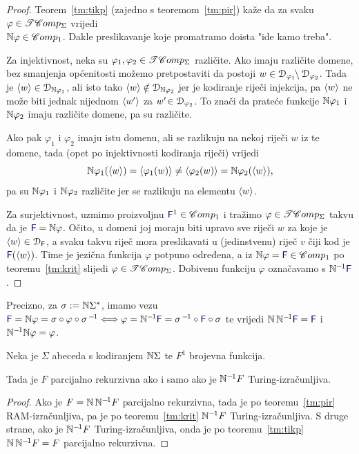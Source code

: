 \begin{proof}
Teorem~\ref{tm:tikp} (zajedno s teoremom~\ref{tm:pir}) kaže da za svaku $\varphi\in\mathscr{TC}omp_\Sigma$ vrijedi\\ ${\mathbb N}\varphi\in\mathscr Comp_1$. Dakle preslikavanje koje promatramo doista "ide kamo treba".

Za injektivnost, neka su $\varphi_1,\varphi_2\in\mathscr{TC}omp_\Sigma$ različite. Ako imaju različite domene, bez smanjenja općenitosti možemo pretpostaviti da postoji $w\in\mathcal D_{\varphi_1}\!\!\setminus\mathcal D_{\varphi_2}$. Tada je $\langle w\rangle\in\mathcal D_{{\mathbb N}\varphi_1}$, ali isto tako $\langle w\rangle\notin\mathcal D_{{\mathbb N}\varphi_2}$ jer je kodiranje riječi injekcija, pa $\langle w\rangle$ ne može biti jednak nijednom $\langle w'\rangle$ za $w'\!\in\mathcal D_{\varphi_2}$. To znači da prateće funkcije ${\mathbb N}\varphi_1$ i ${\mathbb N}\varphi_2$ imaju različite domene, pa su različite.

Ako pak $\varphi_1$ i $\varphi_2$ imaju istu domenu, ali se razlikuju na nekoj riječi $w$ iz te domene, tada (opet po injektivnosti kodiranja riječi) vrijedi
\begin{equation}
    {\mathbb N}\varphi_1(\langle w\rangle)=\langle\varphi_1(w)\rangle\ne\langle\varphi_2(w)\rangle={\mathbb N}\varphi_2(\langle w\rangle)\text,
\end{equation}
pa su ${\mathbb N}\varphi_1$ i ${\mathbb N}\varphi_2$ različite jer se razlikuju na elementu $\langle w\rangle$.

	Za surjektivnost, uzmimo proizvoljnu $\f F^1\in\mathscr Comp_1$ i tražimo $\varphi\in\mathscr{TC}omp_\Sigma$ takvu da je $\f F=\N\varphi$. Očito, u domeni joj moraju biti upravo sve riječi $w$ za koje je $\kr w\in\dom{\f F}$, a svaku takvu riječ mora preslikavati u (jedinstvenu) riječ $v$ čiji kod je $\f F(\kr w)$. Time je jezična funkcija $\varphi$ potpuno određena, a iz $\N\varphi=\f F\in\mathscr Comp_1$ po teoremu~\ref{tm:krit} slijedi $\varphi\in\mathscr{TC}omp_\Sigma$. Dobivenu funkciju $\varphi$ označavamo s $\N^{-\mspace{-2mu}1}\f F$.
\end{proof}
Precizno, za $\sigma:={\mathbb N}\Sigma^*$, imamo vezu
	$\f F=\N\varphi=\sigma\circ\varphi\circ\sigma^{\,-\mspace{-2mu}1}\Longleftrightarrow
	\varphi=\N^{-\mspace{-2mu}1}\f F=\sigma^{\,-\mspace{-2mu}1}\circ\f F\circ\sigma$
te vrijedi $\N\,\N^{-\mspace{-2mu}1}\f F=\f F$ i ${\mathbb N}^{-\mspace{-2mu}1}{\mathbb N}\varphi=\varphi$.

\begin{korolar}[{name=[jednomjesne brojevne funkcije u različitim modelima]}]\label{kor:pent}
Neka je $\Sigma$ abeceda s kodiranjem ${\mathbb N}\Sigma$ te $F^1$ brojevna funkcija.

	Tada je $F$ parcijalno rekurzivna ako i samo ako je ${\mathbb N}^{-\mspace{-2mu}1}F$ Turing-izračunljiva.
\end{korolar}
\begin{proof}
	Ako je $F={\mathbb N}\,{\mathbb N}^{-\mspace{-2mu}1}F$ parcijalno rekurzivna, tada je po teoremu~\ref{tm:pir} RAM-izračunljiva, pa je po teoremu~\ref{tm:krit} ${\mathbb N}^{-\mspace{-2mu}1}F$ Turing-izračunljiva. S druge strane, ako je ${\mathbb N}^{-\mspace{-2mu}1}F$ Turing-izračunljiva, onda je po teoremu~\ref{tm:tikp} ${\mathbb N}\,{\mathbb N}^{-\mspace{-2mu}1}F=F$ parcijalno rekurzivna.
\end{proof}

